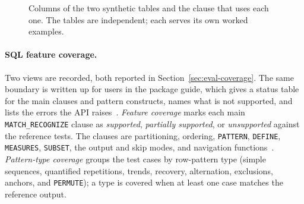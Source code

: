 \begin{figure}[htbp]
  \centering
  \caption[Columns of the two synthetic tables]{Columns of the two
    synthetic tables and the clause that uses each one.  The tables are
    independent; each serves its own worked examples.}
  \label{fig:eval-sample-tables}
\end{figure}

\paragraph{SQL feature coverage.}
Two views are recorded, both reported in
Section~\ref{sec:eval-coverage}.  The same boundary is written up for
users in the package guide, which gives a status table for the main
clauses and pattern constructs, names what is not supported, and lists
the errors the API raises~\cite{monierashraf2025guide}.  \emph{Feature coverage} marks each
main \texttt{MATCH\_RECOGNIZE} clause as \emph{supported},
\emph{partially supported}, or \emph{unsupported} against the
reference tests.  The clauses are
partitioning, ordering, \texttt{PATTERN}, \texttt{DEFINE},
\texttt{MEASURES}, \texttt{SUBSET}, the output and skip modes, and
navigation
functions~\cite{iso2016,ISO2021,monierashraf2025rowmatch}.
\emph{Pattern-type coverage} groups the test cases by row-pattern
type (simple sequences, quantified repetitions, trends, recovery,
alternation, exclusions, anchors, and \texttt{PERMUTE}); a type is
covered when at least one case matches the reference output.

